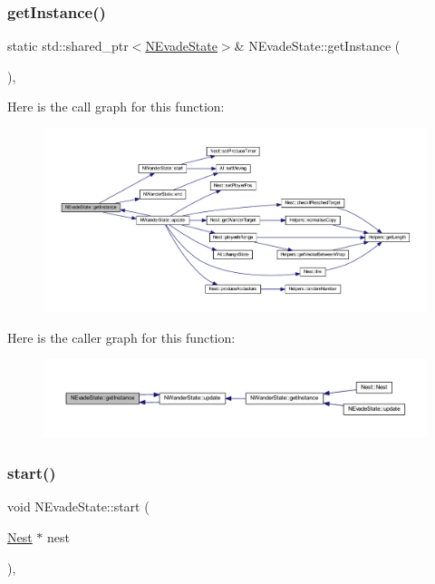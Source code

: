 \subsubsection{\texorpdfstring{get\+Instance()}{getInstance()}}
{\footnotesize\ttfamily static std\+::shared\+\_\+ptr$<$\hyperlink{class_n_evade_state}{N\+Evade\+State}$>$\& N\+Evade\+State\+::get\+Instance (\begin{DoxyParamCaption}{ }\end{DoxyParamCaption})\hspace{0.3cm}{\ttfamily [inline]}, {\ttfamily [static]}}

Here is the call graph for this function\+:
\nopagebreak
\begin{figure}[H]
\begin{center}
\leavevmode
\includegraphics[width=350pt]{class_n_evade_state_add77aa83f13befae11a53a89f3c0ea13_cgraph}
\end{center}
\end{figure}
Here is the caller graph for this function\+:
\nopagebreak
\begin{figure}[H]
\begin{center}
\leavevmode
\includegraphics[width=350pt]{class_n_evade_state_add77aa83f13befae11a53a89f3c0ea13_icgraph}
\end{center}
\end{figure}
\mbox{\label{class_n_evade_state_a4df3fb4c1325d9546ff1f659086d4f38}} 
\subsubsection{\texorpdfstring{start()}{start()}}
{\footnotesize\ttfamily void N\+Evade\+State\+::start (\begin{DoxyParamCaption}\item[{\hyperlink{class_nest}{Nest} $\ast$}]{nest }\end{DoxyParamCaption})\hspace{0.3cm}{\ttfamily [override]}, {\ttfamily [virtual]}}



